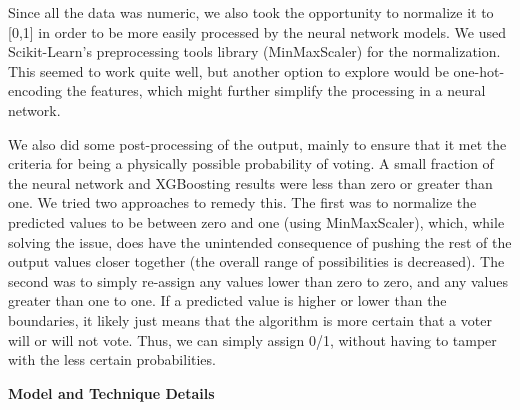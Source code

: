 \noindent
Since all the data was numeric, we also took the opportunity to normalize it to [0,1] in order to be more easily processed by the neural network models. We used Scikit-Learn’s preprocessing tools library (MinMaxScaler) for the normalization. This seemed to work quite well, but another option to explore would be one-hot-encoding the features, which might further simplify the processing in a neural network.

\noindent
We also did some post-processing of the output, mainly to ensure that it met the criteria for being a physically possible probability of voting. A small fraction of the neural network and XGBoosting results were less than zero or greater than one. We tried two approaches to remedy this. The first was to normalize the predicted values to be between zero and one (using MinMaxScaler), which, while solving the issue, does have the unintended consequence of pushing the rest of the output values closer together (the overall range of possibilities is decreased). The second was to simply re-assign any values lower than zero to zero, and any values greater than one to one. If a predicted value is higher or lower than the boundaries, it likely just means that the algorithm is more certain that a voter will or will not vote. Thus, we can simply assign 0/1, without having to tamper with the less certain probabilities.

\vspace{1ex}
\noindent
\textbf{Model and Technique Details}

